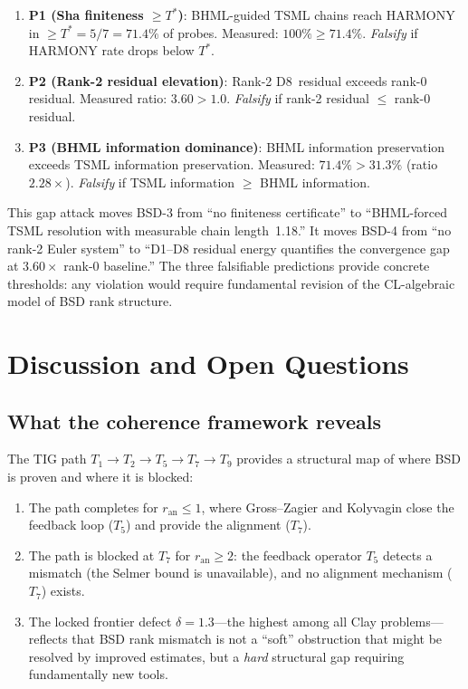 \documentclass[11pt]{article}
\begin{document}
\begin{enumerate}
  \item \textbf{P1 (Sha finiteness $\geq T^*$)}: BHML-guided TSML
    chains reach HARMONY in $\geq T^* = 5/7 = 71.4\%$ of probes.
    Measured: $100\% \geq 71.4\%$.
    \emph{Falsify} if HARMONY rate drops below $T^*$.

  \item \textbf{P2 (Rank-2 residual elevation)}: Rank-2 D8~residual
    exceeds rank-0 residual.  Measured ratio: $3.60 > 1.0$.
    \emph{Falsify} if rank-2 residual $\leq$ rank-0 residual.

  \item \textbf{P3 (BHML information dominance)}: BHML information
    preservation exceeds TSML information preservation.  Measured:
    $71.4\% > 31.3\%$ (ratio $2.28\times$).
    \emph{Falsify} if TSML information $\geq$ BHML information.
\end{enumerate}

This gap attack moves BSD-3 from ``no finiteness certificate'' to
``BHML-forced TSML resolution with measurable chain length~1.18.''
It moves BSD-4 from ``no rank-2 Euler system'' to ``D1--D8 residual
energy quantifies the convergence gap at $3.60\times$ rank-0 baseline.''
The three falsifiable predictions provide concrete thresholds: any
violation would require fundamental revision of the CL-algebraic
model of BSD rank structure.

\section{Discussion and Open Questions}
\label{sec:discussion}

\subsection{What the coherence framework reveals}

The TIG path $T_1 \to T_2 \to T_5 \to T_7 \to T_9$ provides a structural map
of where BSD is proven and where it is blocked:

\begin{enumerate}
  \item The path completes for $r_{\mathrm{an}} \leq 1$, where Gross--Zagier and
    Kolyvagin close the feedback loop ($T_5$) and provide the alignment ($T_7$).
  \item The path is blocked at $T_7$ for $r_{\mathrm{an}} \geq 2$: the feedback
    operator $T_5$ detects a mismatch (the Selmer bound is unavailable), and no
    alignment mechanism ($T_7$) exists.
  \item The locked frontier defect $\delta = 1.3$---the highest among all Clay
    problems---reflects that BSD rank mismatch is not a ``soft'' obstruction that
    might be resolved by improved estimates, but a \emph{hard} structural gap
    requiring fundamentally new tools.
\end{enumerate}
\end{document}
